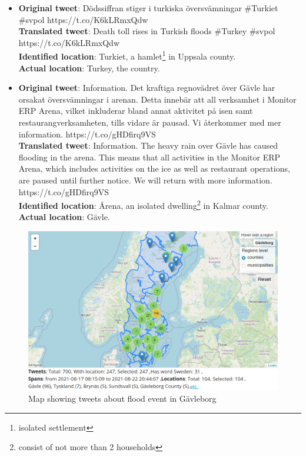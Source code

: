 \begin{itemize}
  \item \textbf{Original tweet}: Dödssiffran stiger i turkiska översvämningar \#Turkiet \#svpol
    https://t.co/K6kLRmxQdw \\
  \textbf{Translated tweet}: Death toll rises in Turkish floods \#Turkey \#svpol \\
    https://t.co/K6kLRmxQdw \\
    \textbf{Identified location}: Turkiet, a hamlet\footnote{isolated settlement} in Uppsala county. \\
    \textbf{Actual location}: Turkey, the country.

  \item \textbf{Original tweet}: Information. Det kraftiga regnovädret över Gävle har orsakat
    översvämningar i arenan. Detta innebär att all verksamhet i Monitor ERP Arena, vilket inkluderar
    bland annat aktivitet på isen samt restaurangverksamheten, tills vidare är pausad. Vi återkommer
    med mer information. https://t.co/gHDfirq9VS \\
    \textbf{Translated tweet}: Information. The heavy rain over Gävle has caused flooding in the arena.
    This means that all activities in the Monitor ERP Arena, which includes activities on the ice as
    well as restaurant operations, are paused until further notice. We will return with more
    information. https://t.co/gHDfirq9VS \\
    \textbf{Identified location}: Årena, an isolated dwelling\footnote{consist of not more than 2 households}
    in Kalmar county. \\
    \textbf{Actual location}: Gävle.


\end{itemize}

\begin{figure}[H]
  \begin{center}
    \includegraphics[width=13cm]{./images/gavle_map.png}
  \end{center}
  \caption{Map showing tweets about flood event in Gävleborg}
  \label{fig:gavle_map}
\end{figure}

